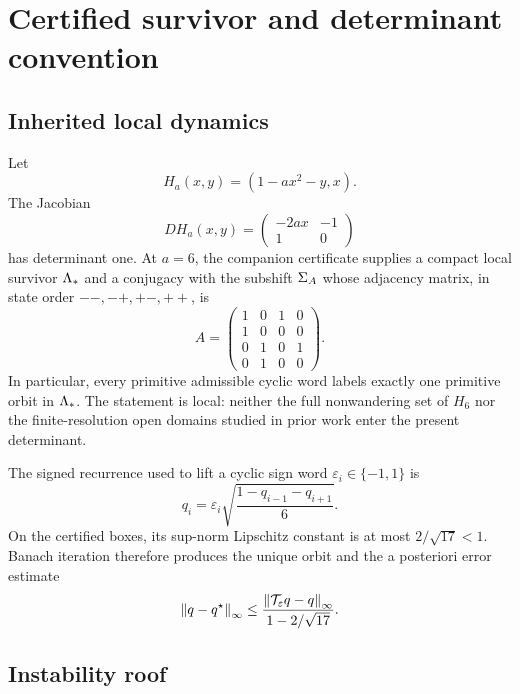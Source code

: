 \section{Certified survivor and determinant convention}
\label{sec:setup}

\subsection{Inherited local dynamics}

Let
\[
  H_a(x,y)=(1-a x^2-y,x).
\]
The Jacobian
\[
  DH_a(x,y)=
  \begin{pmatrix}-2ax&-1\\1&0\end{pmatrix}
\]
has determinant one.  At \(a=6\), the companion certificate supplies a compact
local survivor \(\Lambda_*\) and a conjugacy with the subshift \(\Sigma_A\) whose
adjacency matrix, in state order \(--,-+,+-,++\), is
\begin{equation}
 A=
 \begin{pmatrix}
 1&0&1&0\\
 1&0&0&0\\
 0&1&0&1\\
 0&1&0&0
 \end{pmatrix}.
 \label{eq:adjacency}
\end{equation}
In particular, every primitive admissible cyclic word labels exactly one
primitive orbit in \(\Lambda_*\).  The statement is local: neither the full
nonwandering set of \(H_6\) nor the finite-resolution open domains studied in
prior work enter the present determinant.

The signed recurrence used to lift a cyclic sign word
\(\varepsilon_i\in\{-1,1\}\) is
\begin{equation}
  q_i=\varepsilon_i
  \sqrt{\frac{1-q_{i-1}-q_{i+1}}{6}}.
  \label{eq:sqrt-recurrence}
\end{equation}
On the certified boxes, its sup-norm Lipschitz constant is at most
\(2/\sqrt{17}<1\).  Banach iteration therefore produces the unique orbit and
the a posteriori error estimate
\[
 \left\lVert q-q^\star\right\rVert_\infty
 \le \frac{\left\lVert\mathcal T_\varepsilon q-q\right\rVert_\infty}
 {1-2/\sqrt{17}}.
\]

\subsection{Instability roof}

